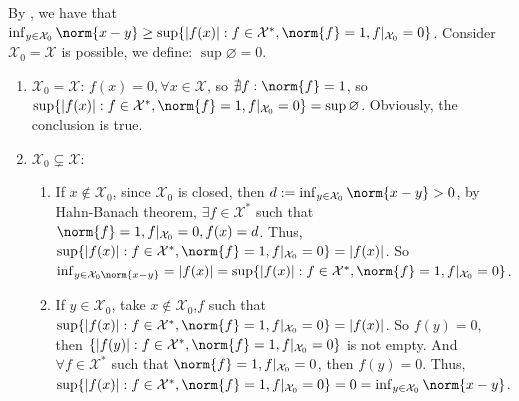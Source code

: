 \documentclass{ctexart}
\begin{document}
\begin{solution}
 By , we have that \(\inf_{y \in \mathcal{X}_0}\norm{x-y} \geq \sup\{|f(x)|:f \in \mathcal{X}^*, \norm{f}=1, f|_{\mathcal{X}_0}=0\} \).
 Consider \(\mathcal{X}_0=\mathcal{X}\) is possible, we define: \(\sup \varnothing =0\).
 \begin{enumerate}
   \item \(\mathcal{X}_0=\mathcal{X}\): \(f(x)=0, \forall x \in \mathcal{X}\), so \(\nexists f: \norm{f}=1\), 
     so \(\sup \{|f(x)|: f \in \mathcal{X}^*, \norm{f}=1, f|_{\mathcal{X}_0}=0\}= \sup \varnothing\).
     Obviously, the conclusion is true.
   \item \(\mathcal{X}_0 \subsetneq \mathcal{X}\):
     \begin{enumerate}
     \item If \(x \notin \mathcal{X}_0\), since \(\mathcal{X}_0\) is closed, then
       \(d:=\inf_{y \in \mathcal{X}_0}\norm{x-y} > 0\), by Hahn-Banach theorem, \(\exists f \in \mathcal{X}^*\) such that
       \(\norm{f}=1, f|_{\mathcal{X}_0}=0, f(x)=d\). Thus, \( \sup\{|f(x)|:f \in \mathcal{X}^*, \norm{f}=1, f|_{\mathcal{X}_0}=0\}=|f(x)| \).
       So \(\inf_{y \in \mathcal{X}_0 \norm{x-y}}= |f(x)|= \sup\{|f(x)|:f \in \mathcal{X}^*, \norm{f}=1, f|_{\mathcal{X}_0}=0\} \).
     \item If \(y \in \mathcal{X}_0\), take \(x \notin \mathcal{X}_0\),\(f\) such that \( \sup\{|f(x)|:f \in \mathcal{X}^*, \norm{f}=1, f|_{\mathcal{X}_0}=0\}=|f(x)| \).
       So \(f(y)=0\), then  \(\{|f(y)|: f \in \mathcal{X}^*, \norm{f}=1, f|_{\mathcal{X}_0}=0\}\) is not empty.
       And \(\forall f \in \mathcal{X}^* \) such that \(\norm{f}=1, f|_{\mathcal{X}_0}=0\), then \(f(y)=0\). 
       Thus, \( \sup\{|f(x)|:f \in \mathcal{X}^*, \norm{f}=1, f|_{\mathcal{X}_0}=0\}=0=\inf_{y \in \mathcal{X}_0}\norm{x-y} \).
     

   \end{enumerate}

 \end{enumerate}
\end{solution}
\end{document}
